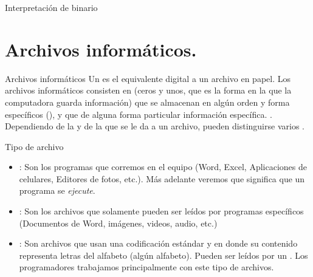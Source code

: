 
\begin{frame}{Interpretación de binario}
\end{frame}


\section{Archivos informáticos.}


\begin{frame}{Archivos informáticos}
  Un  es el equivalente digital a un archivo en papel.
  Los archivos informáticos consisten en  (ceros y unos,
  que es la forma en la que la computadora guarda información) que se almacenan en
  algún orden y forma específicos (), y que 
  de alguna forma particular  información específica.
  \jump
  .
  \jump
  Dependiendo de la  y de la  que se le
  da a un archivo, pueden distinguirse varios .
\end{frame}


\begin{frame}{Tipo de archivo}
  \begin{itemize}
    \item {}: Son los programas que corremos en el
      equipo (Word, Excel, Aplicaciones de celulares, Editores de fotos, etc.).
      Más adelante veremos que significa que un programa se \textit{ejecute}.
    \item {}: Son los archivos que solamente
      pueden ser leídos por programas específicos (Documentos de Word, imágenes,
      videos, audio, etc.)
    \item {}: Son archivos que usan una codificación
      estándar y en donde su contenido representa letras del alfabeto (algún
      alfabeto). Pueden ser leídos por un . Los
      programadores trabajamos principalmente con este tipo de archivos.
  \end{itemize}
\end{frame}

